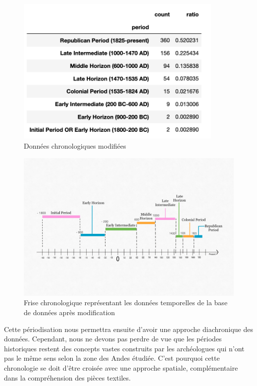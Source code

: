 \begin{figure}[!h]
	\begin{center}
		\includegraphics[width=10cm]{../images/periods_fin.png}
           	 \caption{Données chronologiques modifiées}
           	 \label{chronoFin}
	 \end{center}
  \end{figure}


  \begin{figure}[!h]
	\begin{center}
		\includegraphics[width=15cm]{../images/FriseChronologique2.jpg}
           	 \caption{Frise chronologique représentant les données temporelles de la base de données après modification}
           	 \label{frisechronofinale}
	 \end{center}
  \end{figure}
  
Cette périodisation nous permettra ensuite d'avoir une approche diachronique des données. Cependant, nous ne devons pas perdre de vue que les périodes historiques restent des concepts vastes construits par les archéologues qui n'ont pas le même sens selon la zone des Andes étudiée. C'est pourquoi cette chronologie se doit d'être croisée avec une approche spatiale, complémentaire dans la compréhension des pièces textiles.

